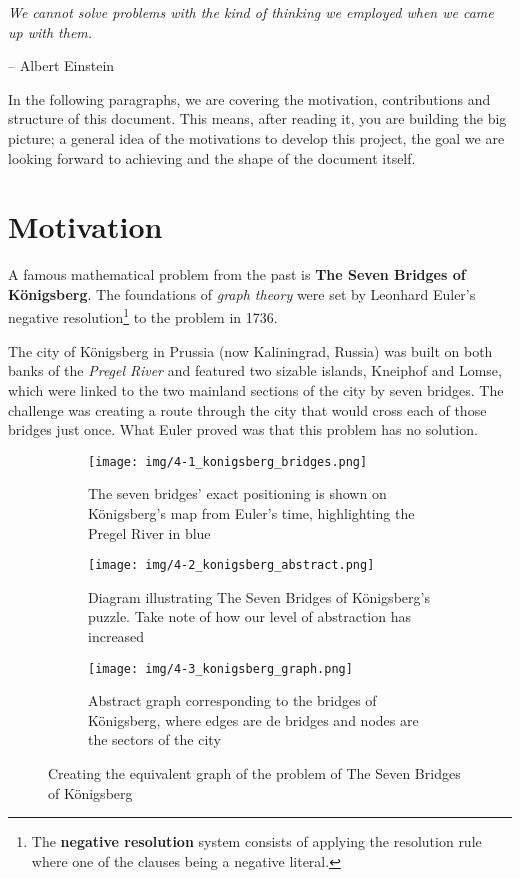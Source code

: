 \epigraph{\textit{We cannot solve problems with the kind of thinking we employed when we came up with them.}}{-- \textup{Albert Einstein}}

In the following paragraphs, we are covering the motivation, contributions and structure of this document. This means, after reading it, you are building the big picture; a general idea of the motivations to develop this project, the goal we are looking forward to achieving and the shape of the document itself.

\section{Motivation}

A famous mathematical problem from the past is \textbf{The Seven Bridges of Königsberg}. The foundations of \textit{graph theory} were set by Leonhard Euler's negative resolution\footnote{The \textbf{negative resolution} system consists of applying the resolution rule where one of the clauses being a negative literal.} to the problem in 1736.

The city of Königsberg in Prussia (now Kaliningrad, Russia) was built on both banks of the \textit{Pregel River} and featured two sizable islands, Kneiphof and Lomse, which were linked to the two mainland sections of the city by seven bridges. The challenge was creating a route through the city that would cross each of those bridges just once. What Euler proved was that this problem has no solution.

\begin{figure}[ht]
    \begin{subfigure}{.3\textwidth}
        \centering
        \texttt{[image: img/4-1\_konigsberg\_bridges.png]}
        \caption{The seven bridges' exact positioning is shown on Königsberg's map from Euler's time, highlighting the Pregel River in blue}
    \end{subfigure}%
    \hspace*{0.5em}
    \begin{subfigure}{.3\textwidth}
        \centering
        \texttt{[image: img/4-2\_konigsberg\_abstract.png]}
        \caption{Diagram illustrating The Seven Bridges of Königsberg's puzzle. Take note of how our level of abstraction has increased}
    \end{subfigure}%
    \hspace*{0.5em}
    \begin{subfigure}{.3\textwidth}
        \centering
        \texttt{[image: img/4-3\_konigsberg\_graph.png]}
        \caption{Abstract graph corresponding to the bridges of Königsberg, where edges are de bridges and nodes are the sectors of the city}
    \end{subfigure}%
    \caption[Creating the equivalent graph of the problem of The Seven Bridges of Königsberg]{Creating the equivalent graph of the problem of The Seven Bridges of Königsberg\footnotemark}
\end{figure}

